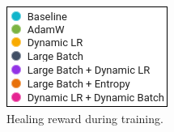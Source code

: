 \documentclass[10pt,conference]{IEEEtran}
\begin{document}
\begin{figure}[htbp]
  \centering
  \begin{minipage}[b]{\textwidth}
    \centering
  \end{minipage}
  \hfill
  \begin{minipage}[b]{\textwidth}
    \centering
    \includegraphics{figs/legend.png}
    \caption{Healing reward during training.}
    \label{fig:levels_sum}
  \end{minipage}
\end{figure}
\end{document}
